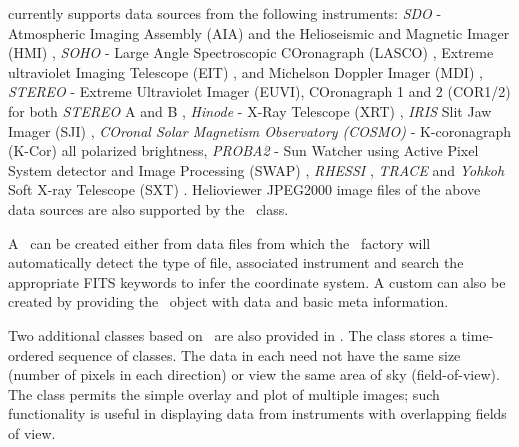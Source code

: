 \Map currently supports data sources from the following instruments:
\textit{SDO} - Atmospheric Imaging Assembly (AIA) \citep{lemen2011atmospheric} and the Helioseismic and Magnetic Imager (HMI) \citep{scherrer2012helioseismic},
\textit{SOHO} - Large Angle Spectroscopic COronagraph (LASCO) \citep{brueckner1995large}, Extreme ultraviolet Imaging Telescope (EIT) \citep{delaboudiniere1995eit}, and Michelson Doppler Imager (MDI) \citep{scherrer1995solar},
\textit{STEREO} - Extreme Ultraviolet Imager (EUVI), COronagraph 1 and 2 (COR1/2) for both \textit{STEREO} A and B \citep{howard2008sun},
\textit{Hinode} - X-Ray Telescope (XRT) \citep{golub2008x},
\textit{IRIS} Slit Jaw Imager (SJI) \citep{DePontieu2014},
\textit{COronal Solar Magnetism Observatory (COSMO)} - K-coronagraph (K-Cor) all polarized brightness,
\textit{PROBA2} - Sun Watcher using Active Pixel System detector and Image Processing (SWAP) \citep{seaton2013swap},
\textit{RHESSI} \citep{lin2002reuven},
\textit{TRACE}
and \textit{Yohkoh} Soft X-ray Telescope (SXT) \citep{tsuneta1991soft}.
Helioviewer JPEG2000 image files of the above data sources are also supported by the \Map\ class.

A \Map\ can be created either from data files from which the \Map\ factory will automatically detect the type of file, associated instrument and search the appropriate FITS keywords to infer the coordinate system.
A custom \GenericMap can also be created by providing the \Map\ object with data and basic meta information.

Two additional classes based on \Map\ are also provided in \sunpypkg.
The  class stores a time-ordered sequence of \Map classes.
The data in each \Map need not have the same size (number of pixels in each direction) or view the same area of sky (field-of-view).
The  class permits the simple overlay and plot of multiple \Map images; such functionality is useful in displaying data from instruments with overlapping fields of view.
